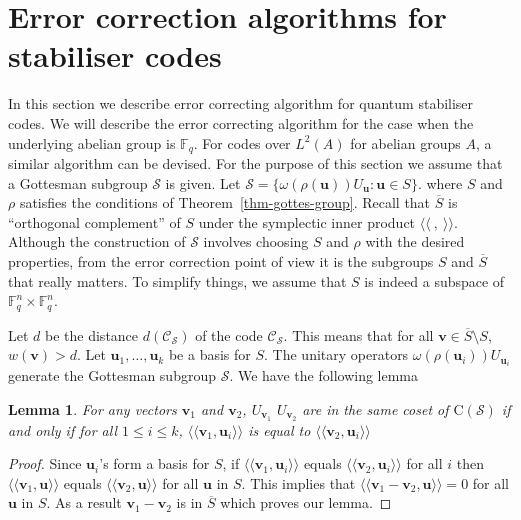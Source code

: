 \documentclass[11pt,twoside]{article}
\newtheorem{lemma}[theorem]{Lemma}
\theoremstyle{definition}
\theoremstyle{remark}
\newcommand{\Weight}[1]{\ensuremath{w\left(#1\right)}}
\newcommand{\Centre}[1]{\ensuremath{\mathrm{C}\left(#1\right)}}
\newcommand{\GF}[0]{\ensuremath{\mathbb{F}}}
\newcommand{\Symp}[2]{\ensuremath{\langle\langle #1, #2 \rangle \rangle}}
\begin{document}
\section{Error correction algorithms for stabiliser codes}

In this section we describe error correcting algorithm for quantum
stabiliser codes. We will describe the error correcting algorithm for
the case when the underlying abelian group is $\GF_q$. For codes over
$L^2(A)$ for abelian groups $A$, a similar algorithm can be devised.
For the purpose of this section we assume that a Gottesman subgroup
$\mathcal{S}$ is given. Let $\mathcal{S} = \{ \omega(\rho(\mathbf{u}))
U_\mathbf{u} : \mathbf{u} \in S \}$.  where $S$ and $\rho$ satisfies
the conditions of Theorem~\ref{thm-gottes-group}. Recall that
$\overline{S}$ is ``orthogonal complement'' of $S$ under the
symplectic inner product $\Symp{\ }{\ }$. Although the construction of
$\mathcal{S}$ involves choosing $S$ and $\rho$ with the desired
properties, {from} the error correction point of view it is the
subgroups $S$ and $\overline{S}$ that really matters.  To simplify
things, we assume that $S$ is indeed a subspace of $\GF_q^n \times
\GF_q^n$.

Let $d$ be the distance $d(\mathcal{C}_\mathcal{S})$ of the code
$\mathcal{C}_\mathcal{S}$. This means that for all $\mathbf{v} \in
\overline{S} \setminus S$, $\Weight{\mathbf{v}} > d$.  Let
$\mathbf{u}_1,\ldots,\mathbf{u}_k$ be a basis for $S$.  The unitary
operators $\omega(\rho(\mathbf{u}_i)) U_{\mathbf{u}_i}$ generate the
Gottesman subgroup $\mathcal{S}$. We have the following lemma

\begin{lemma}\label{lem-coset-center}
  For any vectors $\mathbf{v}_1$ and $\mathbf{v}_2$,
  $U_{\mathbf{v}_1}$ $U_{\mathbf{v}_2}$ are in the same coset of
  $\Centre{\mathcal{S}}$ if and only if for all $1 \leq i \leq k$,
  $\Symp{\mathbf{v}_1}{\mathbf{u}_i}$ is equal to
  $\Symp{\mathbf{v}_2}{\mathbf{u}_i}$
\end{lemma}
\begin{proof}
  Since $\mathbf{u}_i$'s form a basis for $S$, if
  $\Symp{\mathbf{v}_1}{\mathbf{u}_i}$ equals
  $\Symp{\mathbf{v}_2}{\mathbf{u}_i}$ for all $i$ then
  $\Symp{\mathbf{v}_1}{\mathbf{u}}$ equals
  $\Symp{\mathbf{v}_2}{\mathbf{u}}$ for all $\mathbf{u}$ in $S$. This
  implies that $\Symp{\mathbf{v}_1 - \mathbf{v}_2}{\mathbf{u}} = 0$
  for all $\mathbf{u}$ in $S$. As a result $\mathbf{v}_1 -
  \mathbf{v}_2 $ is in $\overline{S}$ which proves our lemma.
\end{proof}
\end{document}

